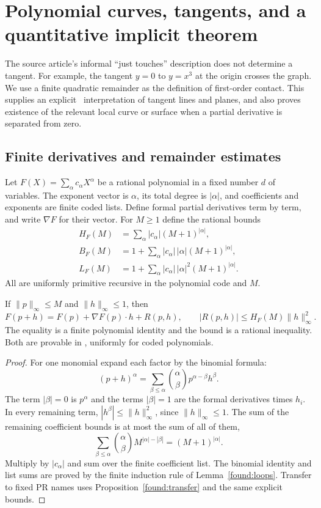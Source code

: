 \section{Polynomial curves, tangents, and a quantitative implicit theorem}
\label{sec:tangency}

The source article's informal ``just touches'' description does not determine
a tangent. For example, the tangent $y=0$ to $y=x^3$ at the origin crosses
the graph. We use a finite quadratic remainder as the definition of first-order
contact. This supplies an explicit \ipra\ interpretation of tangent lines and
planes, and also proves existence of the relevant local curve or surface when
a partial derivative is separated from zero.

\subsection{Finite derivatives and remainder estimates}

Let $F(X)=\sum_\alpha c_\alpha X^\alpha$ be a rational polynomial in a
fixed number $d$ of variables. The exponent vector is $\alpha$, its total
degree is $|\alpha|$, and coefficients and exponents are finite coded lists.
Define formal partial derivatives term by term, and write $\nabla F$ for
their vector. For $M\ge1$ define the rational bounds
\begin{align*}
 H_F(M)&=\sum_\alpha |c_\alpha|(M+1)^{|\alpha|},\\
 B_F(M)&=1+\sum_\alpha |c_\alpha|\,|\alpha|(M+1)^{|\alpha|},\\
 L_F(M)&=1+\sum_\alpha |c_\alpha|\,|\alpha|^2(M+1)^{|\alpha|}.
\end{align*}
All are uniformly primitive recursive in the polynomial code and $M$.

\begin{theorem}
\label{tan:taylor}
If $\|p\|_\infty\le M$ and $\|h\|_\infty\le1$, then
\[
 F(p+h)=F(p)+\nabla F(p)\cdot h+R(p,h),\qquad
 |R(p,h)|\le H_F(M)\|h\|_\infty^2.
\]
The equality is a finite polynomial identity and the bound is a rational
inequality. Both are provable in \ipra, uniformly for coded polynomials.
\end{theorem}
\begin{proof}
For one monomial expand each factor by the binomial formula:
\[
 (p+h)^\alpha=\sum_{\beta\le\alpha}
 {\alpha\choose\beta}p^{\alpha-\beta}h^\beta.
\]
The term $|\beta|=0$ is $p^\alpha$ and the terms $|\beta|=1$ are
the formal derivatives times $h_i$. In every remaining term,
$|h^\beta|\le\|h\|_\infty^2$, since $\|h\|_\infty\le1$.
The sum of the remaining coefficient bounds is at most the sum of all
of them,
\[
 \sum_{\beta\le\alpha}{\alpha\choose\beta}M^{|\alpha|-|\beta|}
       =(M+1)^{|\alpha|}.
\]
Multiply by $|c_\alpha|$ and sum over the finite coefficient list.
The binomial identity and list sums are proved by the finite induction
rule of Lemma~\ref{found:loops}. Transfer to fixed PR names uses
Proposition~\ref{found:transfer} and the same explicit bounds.
\end{proof}


